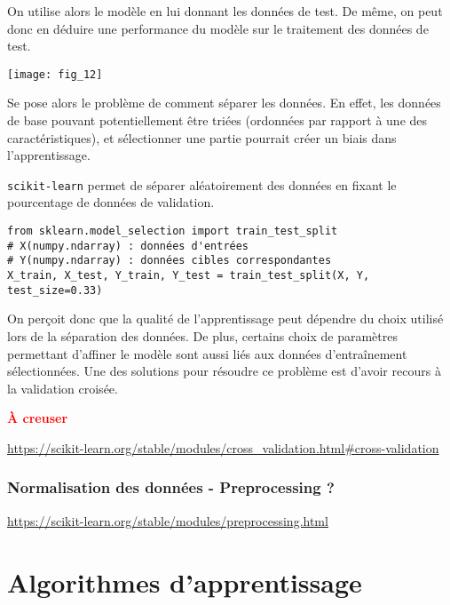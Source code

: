 On utilise alors le modèle en lui donnant les données de test. De même, on peut donc en déduire une performance du modèle sur le traitement des données de test.  

\begin{center}
\texttt{[image: fig\_12]}
\end{center}

 Se pose alors le problème de comment séparer les données. En effet, les données de base pouvant potentiellement être triées (ordonnées par rapport à une des caractéristiques), et sélectionner une partie pourrait créer un biais dans l'apprentissage. 

\texttt{scikit-learn} permet de séparer aléatoirement des données en fixant le pourcentage de données de validation.


\begin{lstlisting}
from sklearn.model_selection import train_test_split
# X(numpy.ndarray) : données d'entrées
# Y(numpy.ndarray) : données cibles correspondantes
X_train, X_test, Y_train, Y_test = train_test_split(X, Y, test_size=0.33)
\end{lstlisting}


On perçoit donc que la qualité de l'apprentissage peut dépendre du choix utilisé lors de la séparation des données. De plus, certains choix de paramètres permettant d’affiner le modèle sont aussi liés aux données d’entraînement sélectionnées. 
Une des solutions pour résoudre ce problème est d'avoir recours à la validation croisée. 

\textcolor{red}{\textbf{À creuser}}



\url{https://scikit-learn.org/stable/modules/cross_validation.html#cross-validation}

\subsubsection{Normalisation des données - Preprocessing ?}

\url{https://scikit-learn.org/stable/modules/preprocessing.html}


\section{Algorithmes d'apprentissage}

